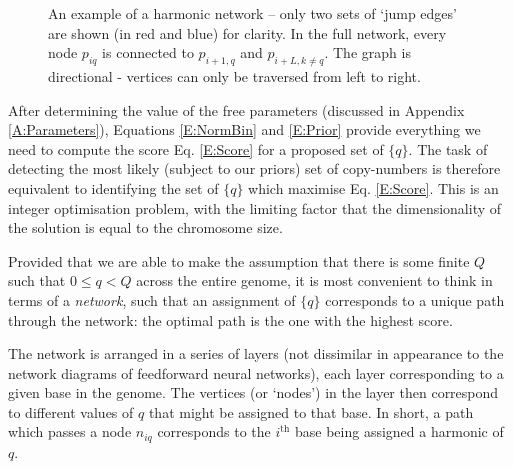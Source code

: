 \documentclass[fleqn,usenatbib]{acmart}
\newcommand{\eref}[1]{Eq. \eqref{#1}}
\begin{document}
\begin{figure}
\begin{center}
{
					}
					\caption{An example of a harmonic network -- only two sets of `jump edges' are shown (in red and blue) for clarity. In the full network, every node $p_{iq}$ is connected to $p_{i+1,q}$ and $p_{i+L,k\neq q}$. The graph is directional - vertices can only be traversed from left to right.}\label{F:Network}
				\end{center}
			
			\end{figure}

				After determining the value of the free parameters (discussed in Appendix \ref{A:Parameters}), Equations \eqref{E:NormBin} and \eqref{E:Prior} provide everything we need to compute the score \eref{E:Score} for a proposed set of $\{q\}$. The task of detecting the most likely (subject to our priors) set of copy-numbers is therefore equivalent to identifying the set of $\{q\}$ which maximise \eref{E:Score}. This is an integer optimisation problem, with the limiting factor that the dimensionality of the solution is equal to the chromosome size.


				Provided that we are able to make the assumption that there is some finite $Q$ such that $0 \leq q < Q$ across the entire genome, it is most convenient to think in terms of a \textit{network}, such that an assignment of $\{q\}$ corresponds to a unique path through the network: the optimal path is the one with the highest score.

				The network is arranged in a series of layers (not dissimilar in appearance to the network diagrams of feedforward neural networks), each layer corresponding to a given base in the genome. The vertices (or `nodes') in the layer then correspond to different values of $q$ that might be assigned to that base. In short, a path which passes a node $n_{iq}$ corresponds to the $i^\text{th}$ base being assigned a harmonic of $q$.
\end{document}
